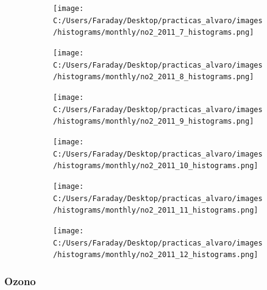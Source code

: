 \documentclass[12pt]{article}
\begin{document}
\newpage

\begin{figure}[H]
\centering
\begin{subfigure}[h]{0.45\textwidth}
\texttt{[image: C:/Users/Faraday/Desktop/practicas\_alvaro/images/histograms/monthly/no2\_2011\_7\_histograms.png]}
\caption{}
\label{fig:hist-mon-1-7-2011}
\end{subfigure}
%
\begin{subfigure}[H]{0.45\textwidth}
\texttt{[image: C:/Users/Faraday/Desktop/practicas\_alvaro/images/histograms/monthly/no2\_2011\_8\_histograms.png]}
\caption{}
\label{fig:hist-mon-1-8-2011}
\end{subfigure}
\caption{}
\end{figure}

\begin{figure}[H]
\centering
\begin{subfigure}[h]{0.45\textwidth}
\texttt{[image: C:/Users/Faraday/Desktop/practicas\_alvaro/images/histograms/monthly/no2\_2011\_9\_histograms.png]}
\caption{}
\label{fig:hist-mon-1-9-2011}
\end{subfigure}
%
\begin{subfigure}[H]{0.45\textwidth}
\texttt{[image: C:/Users/Faraday/Desktop/practicas\_alvaro/images/histograms/monthly/no2\_2011\_10\_histograms.png]}
\caption{}
\label{fig:hist-mon-1-10-2011}
\end{subfigure}
\caption{}
\end{figure}

\begin{figure}[H]
\centering
\begin{subfigure}[h]{0.45\textwidth}
\texttt{[image: C:/Users/Faraday/Desktop/practicas\_alvaro/images/histograms/monthly/no2\_2011\_11\_histograms.png]}
\caption{}
\label{fig:hist-mon-1-11-2011}
\end{subfigure}
%
\begin{subfigure}[H]{0.45\textwidth}
\texttt{[image: C:/Users/Faraday/Desktop/practicas\_alvaro/images/histograms/monthly/no2\_2011\_12\_histograms.png]}
\caption{}
\label{fig:hist-mon-1-12-2011}
\end{subfigure}
\caption{}
\end{figure}

\newpage

\subsubsection*{Ozono}
%
\end{document}
